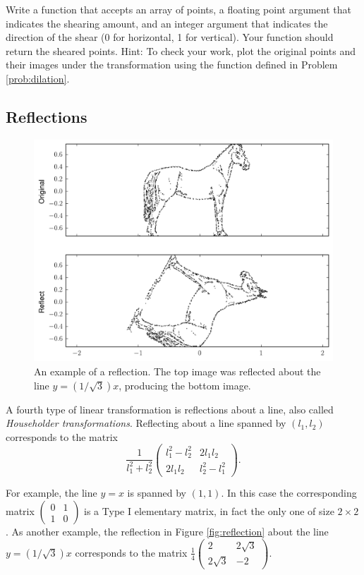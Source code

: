 \begin{problem}[Optional]
Write a function that accepts an array of points, a floating point argument that indicates the shearing amount, and an integer argument that indicates the direction of the shear (0 for horizontal, 1 for vertical). 
Your function should return the sheared points. 
Hint: To check your work, plot the original points and their images under the transformation using the function  defined in Problem \ref{prob:dilation}.
\end{problem}

\subsection*{Reflections}

\begin{figure}
\includegraphics[width=\textwidth]{reflect.pdf}
\caption{An example of a reflection. 
The top image was reflected about the line $y = (1/\sqrt{3})x$, producing the bottom image.}
\label{fig:reflect}
\end{figure}
A fourth type of linear transformation is reflections about a line, also called \emph{Householder transformations}. 
Reflecting about a line spanned by $(l_1, l_2)$ corresponds to the matrix
\[
\frac{1}{l_1^2 + l_2^2}
\begin{pmatrix}
l_1^2 - l_2^2 & 2l_1l_2 \\
2l_1l_2 & l_2^2 - l_1^2
\end{pmatrix}.
\]

For example, the line $y=x$ is spanned by $(1, 1)$. 
In this case the corresponding matrix $\begin{pmatrix}
0 & 1\\
1 & 0
\end{pmatrix}$ is a Type I elementary matrix, in fact the only one of size $2 \times 2$. 
As another example, the reflection in Figure \ref{fig:reflection} about the line $y = (1/\sqrt{3})x$ corresponds to the matrix $\frac{1}{4}\begin{pmatrix}
2 & 2\sqrt{3}\\
2\sqrt{3} & -2
\end{pmatrix}$.

